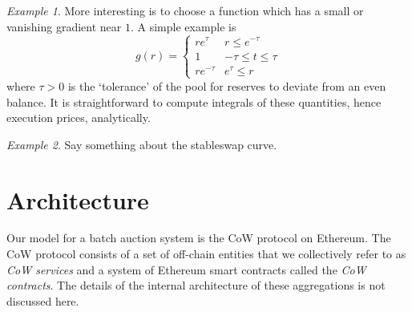 \documentclass[a4paper,10pt]{article}
\theoremstyle{remark}
\newtheorem*{example}{Example}
\begin{document}
\begin{example}
More interesting is to choose a function which has a small or vanishing gradient near $1$. A simple example is
\[
  g(r) = \left\{\begin{array}{ll}
    re^\tau & r \leq e^{-\tau} \\
    1           & -\tau \leq t \leq \tau \\
    re^{-\tau} & e^\tau\leq r
  \end{array}\right.
\]
where $\tau >0$ is the `tolerance' of the pool for reserves to deviate from an even balance.
%
It is straightforward to compute integrals of these quantities, hence execution prices, analytically. 
\end{example}

\begin{example}
  Say something about the stableswap curve. 
\end{example}

\section{Architecture}

Our model for a batch auction system is the CoW protocol on Ethereum.
%
The CoW protocol consists of a set of off-chain entities that we collectively refer to as \emph{CoW services} and a system of Ethereum smart contracts called the \emph{CoW contracts}. The details of the internal architecture of these aggregations is not discussed here.
\end{document}
